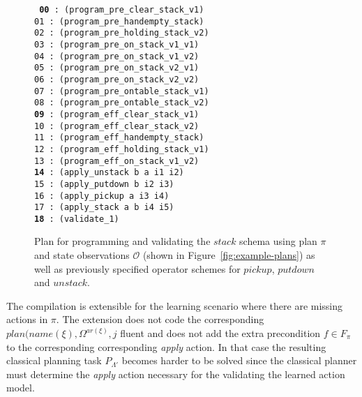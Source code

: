 \documentclass[3p,times]{elsarticle}
\begin{document}
\begin{figure}[hbt!]
{\footnotesize\tt
     {\bf 00} : (program\_pre\_clear\_stack\_v1)\\
     01 : (program\_pre\_handempty\_stack)\\
     02 : (program\_pre\_holding\_stack\_v2)\\
     03 : (program\_pre\_on\_stack\_v1\_v1)\\
     04 : (program\_pre\_on\_stack\_v1\_v2)\\
     05 : (program\_pre\_on\_stack\_v2\_v1)\\
     06 : (program\_pre\_on\_stack\_v2\_v2)\\
     07 : (program\_pre\_ontable\_stack\_v1)\\
     08 : (program\_pre\_ontable\_stack\_v2)\\
     {\bf 09} : (program\_eff\_clear\_stack\_v1)\\
    10 : (program\_eff\_clear\_stack\_v2)\\
    11 : (program\_eff\_handempty\_stack)\\
    12 : (program\_eff\_holding\_stack\_v1)\\
    13 : (program\_eff\_on\_stack\_v1\_v2)\\
    {\bf 14} : (apply\_unstack b a i1 i2)\\
    15 : (apply\_putdown b i2 i3)\\
    16 : (apply\_pickup a i3 i4)\\
    17 : (apply\_stack a b i4 i5)\\
    {\bf 18} : (validate\_1)
}
 \caption{\small Plan for programming and validating the $stack$ schema using plan $\pi$ and state observations $\mathcal{O}$ (shown in Figure~\ref{fig:example-plans}) as well as previously specified operator schemes for $pickup$, $putdown$ and $unstack$.}
\label{fig:plan-lplan}
\end{figure}


The compilation is extensible for the learning scenario where there are missing actions in $\pi$. The extension does not code the corresponding $plan(name(\xi),\Omega^{ar(\xi)},j$ fluent and does not add the extra precondition $f\in F_{\pi}$ to the corresponding corresponding {\em apply} action. In that case the resulting classical planning task $P_{\Lambda'}$ becomes harder to be solved since the classical planner must determine the {\em apply} action necessary for the validating the learned action model.
\end{document}
